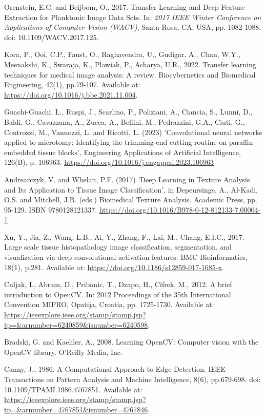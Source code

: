 \begin{thebibliography}{99}
    Orenstein, E.C. and Beijbom, O., 2017. Transfer Learning and Deep Feature Extraction for Planktonic Image Data Sets. In: \textit{2017 IEEE Winter Conference on Applications of Computer Vision (WACV)}, Santa Rosa, CA, USA, pp. 1082-1088. doi: 10.1109/WACV.2017.125.

    Kora, P., Ooi, C.P., Faust, O., Raghavendra, U., Gudigar, A., Chan, W.Y., Meenakshi, K., Swaraja, K., Plawiak, P., Acharya, U.R., 2022. Transfer learning techniques for medical image analysis: A review. Biocybernetics and Biomedical Engineering, 42(1), pp.79-107. Available at: \url{https://doi.org/10.1016/j.bbe.2021.11.004}.

    Guachi-Guachi, L., Ruspi, J., Scarlino, P., Poliziani, A., Ciancia, S., Lunni, D., Baldi, G., Cavazzana, A., Zucca, A., Bellini, M., Pedrazzini, G.A., Ciuti, G., Controzzi, M., Vannozzi, L. and Ricotti, L. (2023) 'Convolutional neural networks applied to microtomy: Identifying the trimming-end cutting routine on paraffin-embedded tissue blocks', Engineering Applications of Artificial Intelligence, 126(B), p. 106963. \url{https://doi.org/10.1016/j.engappai.2023.106963}

    Andrearczyk, V. and Whelan, P.F. (2017) 'Deep Learning in Texture Analysis and Its Application to Tissue Image Classification', in Depeursinge, A., Al-Kadi, O.S. and Mitchell, J.R. (eds.) Biomedical Texture Analysis. Academic Press, pp. 95-129. ISBN 9780128121337. \url{https://doi.org/10.1016/B978-0-12-812133-7.00004-1}

    Xu, Y., Jia, Z., Wang, L.B., Ai, Y., Zhang, F., Lai, M., Chang, E.I.C., 2017. Large scale tissue histopathology image classification, segmentation, and visualization via deep convolutional activation features. BMC Bioinformatics, 18(1), p.281. Available at: \url{https://doi.org/10.1186/s12859-017-1685-x}.
    
    Culjak, I., Abram, D., Pribanic, T., Dzapo, H., Cifrek, M., 2012. A brief introduction to OpenCV. In: 2012 Proceedings of the 35th International Convention MIPRO, Opatija, Croatia, pp. 1725-1730. Available at: \url{https://ieeexplore.ieee.org/stamp/stamp.jsp?tp=&arnumber=6240859&isnumber=6240598}.

    Bradski, G. and Kaehler, A., 2008. Learning OpenCV: Computer vision with the OpenCV library. O'Reilly Media, Inc.

    Canny, J., 1986. A Computational Approach to Edge Detection. IEEE Transactions on Pattern Analysis and Machine Intelligence, 8(6), pp.679-698. doi: 10.1109/TPAMI.1986.4767851. Available at: \url{https://ieeexplore.ieee.org/stamp/stamp.jsp?tp=&arnumber=4767851&isnumber=4767846}.


\end{thebibliography}
